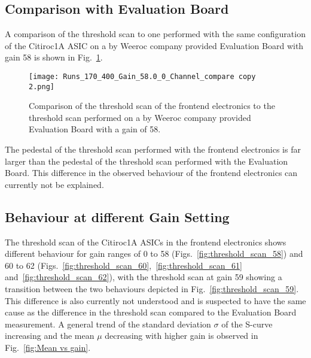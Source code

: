     \subsection{Comparison with Evaluation Board} 
    A comparison of the threshold scan to one performed with the same configuration of the Citiroc1A ASIC on a by Weeroc company provided Evaluation Board with gain 58 is shown in Fig.~\ref{fig:threshold_scan_comparison_58}.%
    \begin{figure}[H]
        \centering
        \texttt{[image: Runs\_170\_400\_Gain\_58.0\_0\_Channel\_compare copy 2.png]}
        \caption{Comparison of the threshold scan of the frontend electronics to the threshold scan performed on a by Weeroc company provided Evaluation Board with a gain of 58.}
        \label{fig:threshold_scan_comparison_58}
    \end{figure}
    
 
    The pedestal of the threshold scan performed with the frontend electronics is far larger than the pedestal of the threshold scan performed with the Evaluation Board.
    This difference in the observed behaviour of the frontend electronics can currently not be explained.
    \subsection{Behaviour at different Gain Setting}
    The threshold scan of the Citiroc1A ASICs in the frontend electronics shows different behaviour for gain ranges of 0 to 58 (Figs.~\ref{fig:threshold_scan_58}) and 60 to 62 (Figs.~\ref{fig:threshold_scan_60},~\ref{fig:threshold_scan_61} and~\ref{fig:threshold_scan_62}),
    with the threshold scan at gain 59 showing a transition between the two behaviours depicted in Fig.~\ref{fig:threshold_scan_59}.
    This difference is also currently not understood and is suspected to have the same cause as the difference in the threshold scan compared to the Evaluation Board measurement. 
    \newline
    A general trend of the standard deviation $\sigma$ of the S-curve increasing and the mean $\mu$ decreasing with higher gain is observed in Fig.~\ref{fig:Mean vs gain}.
